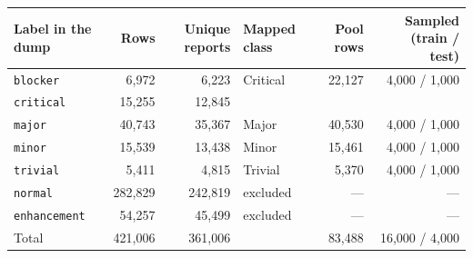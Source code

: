 \begin{tabular*}{\tblwidth}{@{\extracolsep{\fill}} lrrlrr @{}}
\toprule
Label in the dump & Rows & Unique reports & Mapped class & Pool rows & Sampled (train / test) \\
\midrule
\texttt{blocker} & 6,972 & 6,223 & Critical & 22,127 & 4,000 / 1,000 \\
\texttt{critical} & 15,255 & 12,845 &  &  &  \\
\texttt{major} & 40,743 & 35,367 & Major & 40,530 & 4,000 / 1,000 \\
\texttt{minor} & 15,539 & 13,438 & Minor & 15,461 & 4,000 / 1,000 \\
\texttt{trivial} & 5,411 & 4,815 & Trivial & 5,370 & 4,000 / 1,000 \\
\texttt{normal} & 282,829 & 242,819 & excluded & --- & --- \\
\texttt{enhancement} & 54,257 & 45,499 & excluded & --- & --- \\
\midrule
Total & 421,006 & 361,006 & & 83,488 & 16,000 / 4,000 \\
\bottomrule
\end{tabular*}
